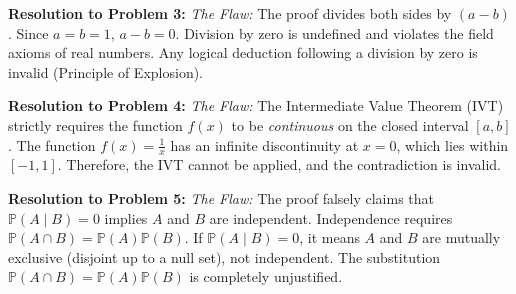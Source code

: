 \documentclass[11pt, letterpaper]{article}
\theoremstyle{remark}
\newcommand{\Prob}{\mathbb{P}}
\begin{document}
\textbf{Resolution to Problem 3:}
\textit{The Flaw:} The proof divides both sides by $(a-b)$. Since $a = b = 1$, $a - b = 0$. Division by zero is undefined and violates the field axioms of real numbers. Any logical deduction following a division by zero is invalid (Principle of Explosion).

\textbf{Resolution to Problem 4:}
\textit{The Flaw:} The Intermediate Value Theorem (IVT) strictly requires the function $f(x)$ to be \textit{continuous} on the closed interval $[a, b]$. The function $f(x) = \frac{1}{x}$ has an infinite discontinuity at $x = 0$, which lies within $[-1, 1]$. Therefore, the IVT cannot be applied, and the contradiction is invalid.

\textbf{Resolution to Problem 5:}
\textit{The Flaw:} The proof falsely claims that $\Prob(A \mid B) = 0$ implies $A$ and $B$ are independent. Independence requires $\Prob(A \cap B) = \Prob(A)\Prob(B)$. If $\Prob(A \mid B) = 0$, it means $A$ and $B$ are mutually exclusive (disjoint up to a null set), not independent. The substitution $\Prob(A \cap B) = \Prob(A)\Prob(B)$ is completely unjustified.
\end{document}
